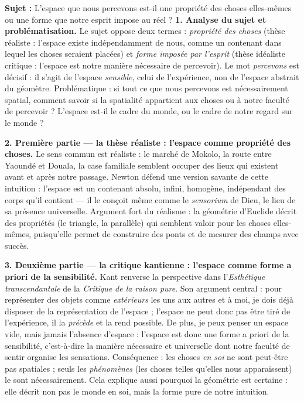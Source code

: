 \documentclass[11pt]{article}
\newcommand{\cle}[1]{{\popxbold\color{popdark}#1}}
\begin{document}
\begin{exoresolu}
\textbf{Sujet :} L'espace que nous percevons est-il une propriété des choses elles-mêmes ou une forme que notre esprit impose au réel ?
\tcblower
\textbf{1. Analyse du sujet et problématisation.} Le sujet oppose deux termes : \emph{propriété des choses} (thèse réaliste : l'espace existe indépendamment de nous, comme un contenant dans lequel les choses seraient placées) et \emph{forme imposée par l'esprit} (thèse idéaliste critique : l'espace est notre manière nécessaire de percevoir). Le mot \emph{percevons} est décisif : il s'agit de l'espace \emph{sensible}, celui de l'expérience, non de l'espace abstrait du géomètre. Problématique : si tout ce que nous percevons est nécessairement spatial, comment savoir si la spatialité appartient aux choses ou à notre faculté de percevoir ? L'espace est-il le cadre du monde, ou le cadre de notre regard sur le monde ?

\textbf{2. Première partie --- la thèse réaliste : l'espace comme propriété des choses.} Le sens commun est réaliste : le marché de Mokolo, la route entre Yaoundé et Douala, la case familiale semblent occuper des lieux qui existent avant et après notre passage. Newton défend une version savante de cette intuition : l'espace est un contenant absolu, infini, homogène, indépendant des corps qu'il contient --- il le conçoit même comme le \emph{sensorium} de Dieu, le lieu de sa présence universelle. Argument fort du réalisme : la géométrie d'Euclide décrit des propriétés (le triangle, la parallèle) qui semblent valoir pour les choses elles-mêmes, puisqu'elle permet de construire des ponts et de mesurer des champs avec succès.

\textbf{3. Deuxième partie --- la critique kantienne : l'espace comme forme a priori de la sensibilité.} Kant renverse la perspective dans l'\emph{Esthétique transcendantale} de la \emph{Critique de la raison pure}. Son argument central : pour représenter des objets comme \emph{extérieurs} les uns aux autres et à moi, je dois déjà disposer de la représentation de l'espace ; l'espace ne peut donc pas être tiré de l'expérience, il la \emph{précède} et la rend possible. De plus, je peux penser un espace vide, mais jamais l'absence d'espace : l'espace est donc une \cle{forme a priori de la sensibilité}, c'est-à-dire la manière nécessaire et universelle dont notre faculté de sentir organise les sensations. Conséquence : les choses \emph{en soi} ne sont peut-être pas spatiales ; seuls les \emph{phénomènes} (les choses telles qu'elles nous apparaissent) le sont nécessairement. Cela explique aussi pourquoi la géométrie est certaine : elle décrit non pas le monde en soi, mais la forme pure de notre intuition.


\end{exoresolu}
\end{document}
